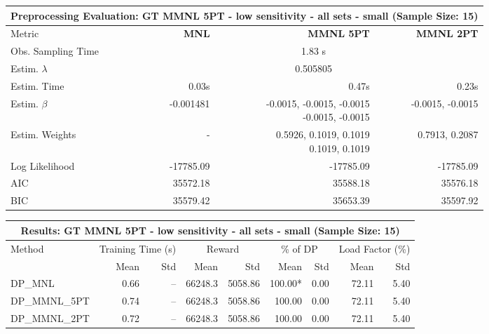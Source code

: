 
\begin{samepage}
\begin{center}
  \small
  \begin{tabular}{l|r|r|r}
    \toprule
    \multicolumn{4}{c}{\textbf{Preprocessing Evaluation: GT MMNL 5PT - low sensitivity - all sets - small (Sample Size: 15)}} \\
    \midrule
    Metric & \textbf{MNL} & \textbf{MMNL 5PT} & \textbf{MMNL 2PT} \\
    \midrule
    Obs. Sampling Time & \multicolumn{3}{c}{1.83 s} \\
    Estim. $\lambda$ & \multicolumn{3}{c}{0.505805} \\
    Estim. Time & 0.03s & 0.47s & 0.23s \\
    Estim. $\beta$ & -0.001481 & \makecell[tr]{-0.0015, -0.0015, -0.0015 \\ -0.0015, -0.0015} & -0.0015, -0.0015 \\
    Estim. Weights & - & \makecell[tr]{0.5926, 0.1019, 0.1019 \\ 0.1019, 0.1019} & 0.7913, 0.2087 \\
    Log Likelihood & -17785.09 & -17785.09 & -17785.09 \\
    AIC & 35572.18 & 35588.18 & 35576.18 \\
    BIC & 35579.42 & 35653.39 & 35597.92 \\
    \bottomrule
  \end{tabular}
\end{center}
\begin{center}
  \small
  \begin{tabular}{l|rr|rr|rr|rr}
    \toprule
    \multicolumn{9}{c}{\textbf{Results: GT MMNL 5PT - low sensitivity - all sets - small (Sample Size: 15)}} \\
    \midrule
    Method & \multicolumn{2}{c|}{Training Time (s)} & \multicolumn{2}{c|}{Reward} & \multicolumn{2}{c|}{\% of DP} & \multicolumn{2}{c}{Load Factor (\%)} \\
    & Mean & Std & Mean & Std & Mean & Std & Mean & Std \\
    \midrule
    DP\_MNL      &     0.66 &    -- &    66248.3 &    5058.86 & 100.00* &    0.00 &   72.11 &    5.40 \\
    DP\_MMNL\_5PT &     0.74 &    -- &    66248.3 &    5058.86 &  100.00 &    0.00 &   72.11 &    5.40 \\
    DP\_MMNL\_2PT &     0.72 &    -- &    66248.3 &    5058.86 &  100.00 &    0.00 &   72.11 &    5.40 \\

\end{tabular}
\end{center}
\end{samepage}
